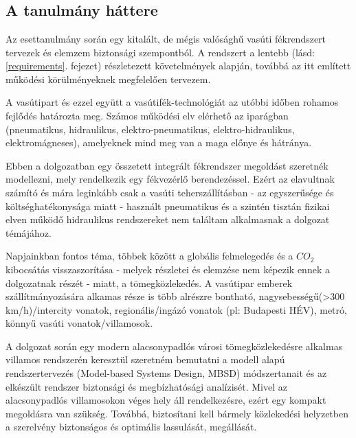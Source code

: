 \chapter{\caseStudy}

\section{A tanulmány háttere}
Az esettanulmány során egy kitalált, de mégis valósághű vasúti fékrendszert tervezek és elemzem biztonsági szempontból.
A rendszert a lentebb (lásd: \ref{requirements}. fejezet) részletezett követelmények alapján, továbbá az itt említett működési körülményeknek megfelelően tervezem.

A vasútipart és ezzel együtt a vasútifék-technológiát az utóbbi időben rohamos fejlődés határozta meg. 
Számos működési elv elérhető az iparágban (pneumatikus, hidraulikus, elektro-pneumatikus, elektro-hidraulikus, elektromágneses), amelyeknek mind meg van a maga előnye és hátránya.

Ebben a dolgozatban egy összetett integrált fékrendszer megoldást szeretnék modellezni, mely rendelkezik egy fékvezérlő berendezéssel.
Ezért az elavultnak számító és mára leginkább csak a vasúti teherszállításban - az egyszerűsége és költséghatékonysága miatt - használt pneumatikus és a szintén tisztán fizikai elven működő hidraulikus rendszereket nem találtam alkalmasnak a dolgozat témájához.

Napjainkban fontos téma, többek között a globális felmelegedés és a ${CO}_2$ kibocsátás visszaszorítása - melyek részletei és elemzése nem képezik ennek a dolgozatnak részét - miatt, a tömegközlekedés.
A vasútipar emberek szállítmányozására alkamas része is több alrészre bontható, nagysebességű(>300 km/h)/intercity vonatok, 
regionális/ingázó vonatok (pl: Budapesti HÉV), metró, könnyű vasúti vonatok/villamosok.

A dolgozat során egy modern alacsonypadlós városi tömegközlekedésre alkalmas villamos rendszerén keresztül szeretném bemutatni a modell alapú rendszertervezés (Model-based Systems Design, MBSD) módszertanait és az elkészült rendszer biztonsági és megbízhatósági analízisét. 
Mivel az alacsonypadlós villamosokon véges hely áll rendelkezésre, ezért egy kompakt megoldásra van szükség. 
Továbbá, biztosítani kell bármely közlekedési helyzetben a szerelvény biztonságos és optimális lassulását, megállását.

